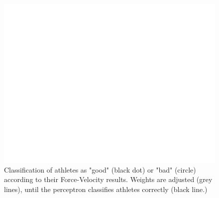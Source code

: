 \begin{figure}[hbtp]
	\centering
	\def\svgwidth{1\columnwidth}
	\fontsize{10pt}{10pt}\selectfont
	\includegraphics[width=\linewidth]{"../Chap2/Figures/Fig_perceptron.png"}
	\caption{Classification of athletes as "good" (black dot) or "bad" (circle) according to their Force-Velocity results. Weights are adjusted (grey lines), until the perceptron classifies athletes correctly (black line.)}
	\label{fig_perceptron}
\end{figure}




